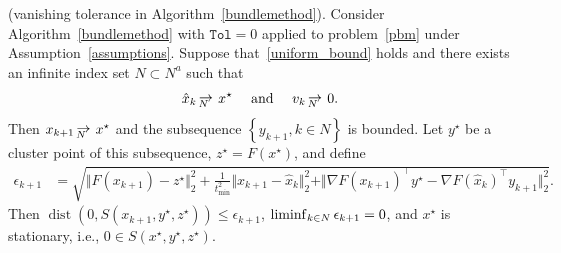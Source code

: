 \documentclass[smallextended,envcountsect]{svjour3}
\newcommand{\norm}[1]{\textstyle{\Vert} #1 \textstyle{\Vert}_2}
\newcommand{\col}[1]{\left\{#1\right\}}
\newcommand{\tol}{\texttt{Tol}}
\newcommand{\nliminf}{\mathop{\rm liminf}\nolimits}
\DeclareMathOperator{\dist}{dist}
\def\Nto{\,{\raise 1pt\hbox{$\rightarrow$}}\kern -12pt
     \hbox{\lower 3pt \hbox{$\, \scriptstyle N$}}\hskip7pt}
\begin{document}
\begin{proposition}{\rm (vanishing tolerance in Algorithm~\ref{bundlemethod}).}\label{prop:vk}
Consider Algorithm~\ref{bundlemethod} with $\tol=0$ applied to problem~\eqref{pbm} under Assumption~\ref{assumptions}.
Suppose that~\eqref{uniform_bound} holds and there exists an infinite index set $N \subset N^a$ such that
\[
\hat x_{k} \Nto  x^\star \quad \text{ and } \quad  v_k \Nto 0.
\]
Then $x_{k+1} \Nto x^\star$ and the subsequence $\col{y_{k+1}, k\in N}$ is bounded. 
Let $y^\star$ be a cluster point of this subsequence, $z^\star= F( x^\star)$,  and define
  \begin{align*}
\epsilon_{k+1}
&=\sqrt{\norm{F(x_{k+1})-z^\star}^2 +\frac{1}{t_{\min}^2}\norm{x_{k+1}-\hat x_k}^2  + \norm{\nabla F(x_{k+1})^\top y^\star - \nabla F(\hat x_{k})^\top  y_{k+1} }^2}.
\end{align*}
Then $\dist(0,S(x_{k+1},y^\star,z^\star)) \leq {\epsilon_{k+1}}$,
$\nliminf_{k\in N} \epsilon_{k+1}=0$, and $x^\star $ is stationary, i.e., $0\in S(x^\star, y^\star,  z^\star)$. 
\end{proposition}
\end{document}
